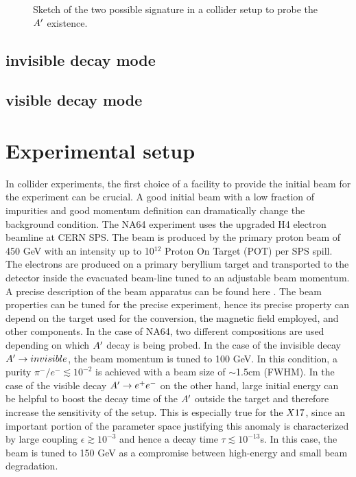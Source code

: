 \begin{figure}[bth!]
\centering
\caption[two signature sketch]{Sketch of the two possible signature in a collider setup to probe the $A'$ existence.}
\label{fig:two-signature}
\end{figure}

\subsection{invisible decay mode}
\label{ch2:sec:experimental-technique-invis}

\subsection{visible decay mode}
\label{ch2:sec:experimental-technique-vis}

\section{Experimental setup}
\label{ch2:sec:experimental-setup}

In collider experiments, the first choice of a facility to provide the initial beam for the experiment can be crucial. A good initial beam with a low fraction of impurities and good momentum definition can dramatically change the background condition. The NA64 experiment uses the upgraded H4 electron beamline at CERN SPS. The beam is produced by the primary proton beam of 450 \si{\giga\electronvolt} with an intensity up to 10$^{12}$ Proton On Target (POT) per SPS spill. The electrons are produced on a primary beryllium target and transported to the detector inside the evacuated beam-line tuned to an adjustable beam momentum. A precise description of the beam apparatus can be found here \cite{sps-beamline,h4-beamline}. The beam properties can be tuned for the precise experiment, hence its precise property can depend on the target used for the conversion, the magnetic field employed, and other components. In the case of NA64, two different compositions are used depending on which $A'$ decay is being probed. In the case of the invisible decay $A'\to invisible$, the beam momentum is tuned to 100 \si{\giga\electronvolt}. In this condition, a purity $\pi^-/e^- \lesssim 10^{-2}$ is achieved with a beam size of $\sim$1.5\si{cm} (FWHM). In the case of the visible decay $A' \to e^+e^-$ on the other hand, large initial energy can be helpful to boost the decay time of the $A'$ outside the target and therefore increase the sensitivity of the setup. This is especially true for the $X17$, since an important portion of the parameter space justifying this anomaly is characterized by large coupling $\epsilon \gtrsim 10^{-3}$ and hence a decay time $\tau \lesssim 10^{-13}$\si{s}. In this case, the beam is tuned to 150 \si{\giga\electronvolt} as a compromise between high-energy and small beam degradation.

